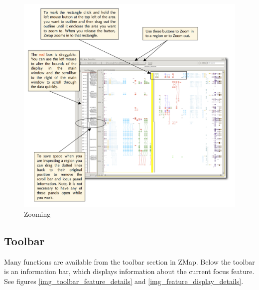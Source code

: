 \documentclass[letterpaper]{article}
\begin{document}
\begin{figure}
\centering
\color[rgb]{0.30980393,0.5058824,0.7411765}
\includegraphics[width=15.231cm]{images/zooming.png}
\caption{Zooming}
\label{img_zooming}
\end{figure}


\subsection{Toolbar} \label{sec_toolbar}
Many functions are available from the toolbar section in ZMap. Below the toolbar is an information bar, which displays information about the current focus feature. See figures \ref{img_toolbar_feature_details} and \ref{img_feature_display_details}.
\end{document}
